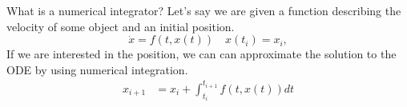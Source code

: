 \documentclass{beamer}
\title[\theTitle]
{\theTitle}
\subtitle{}
\author{\theAuthor}
\institute[MTSU]
{
    \theInstitution\\
    \medskip
    \texttt{me@jacksoncole.io}\enspace\textbullet\enspace\texttt{jacksoncole.io}
}
\date{Fall 2018}
\begin{document}
\begin{frame}
    \titlepage
\end{frame}

\begin{frame}{What is a numerical integrator?}
    Let's say we are given a function describing the velocity of some object and
    an initial position.
    \begin{equation}
        \dot{x} = f\left(t, x\left(t\right)\right)
        \quad
        x\left(t_i\right) = x_i,
    \end{equation}
    If we are interested in the position, we can can approximate the solution
    to the ODE by using numerical integration.
    \begin{equation}
        \begin{aligned}
            x_{i+1} &= x_i + \int_{t_i}^{t_{i+1}}f(t, x(t))dt
        \end{aligned}
    \end{equation}
\end{frame}
\end{document}
